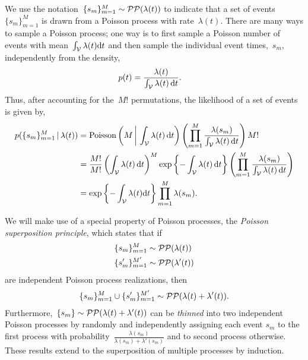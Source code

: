We use the notation~${\{s_m\}_{m=1}^M\sim\mathcal{PP}(\lambda(t))}$ to indicate
that a set of events~$\{s_m\}_{m=1}^M$ is drawn from a Poisson process
with rate~$\lambda(t)$. There are many ways to sample a Poisson
process; one way is to first sample a Poisson number of events with
mean~${\int_{\mathcal{V}} \lambda(t) \mathrm{d}t}$ and then sample the individual
event times,~$s_m$, independently from the density,
\begin{align*}
  p(t) &= \frac{\lambda(t)}{\int_{\mathcal{V}} \lambda(t) \, \mathrm{d}t}.
\end{align*}
Thus, after accounting for the~$M!$ permutations,
the likelihood of a set of events is given by,
\begin{align}
  \nonumber
  p(\{s_m\}_{m=1}^M \,|\, \lambda(t))
  &= \mathrm{Poisson} \left(M \, \bigg| \, \int_{\mathcal{V}} \lambda(t) \, \mathrm{d} t \right)
  \left( \prod_{m=1}^M \frac{\lambda(s_m)}{\int_{\mathcal{V}} \lambda(t) \, \mathrm{d}t} \right)  M! \\
  \nonumber
  &= \frac{M!}{M!} \left(\int_{\mathcal{V}} \lambda(t) \, \mathrm{d} t \right)^M
  \exp \left \{-\int_{\mathcal{V}} \lambda(t) \, \mathrm{d} t \right \} 
  \left( \prod_{m=1}^M \frac{\lambda(s_m)}{\int_{\mathcal{V}} \lambda(t) \, \mathrm{d}t} \right) \\
  \label{eq:poisson_lkhd}
  &=\exp\left\{-\int_{\mathcal{V}}\lambda(t)\mathrm{d}t \right\}
  \prod_{m=1}^M\lambda(s_m).
\end{align}


We will make use of a special property of Poisson processes, the
\emph{Poisson superposition principle}, which states that if
\begin{align*}
  \{s_{m}\}_{m=1}^{M} &\sim \mathcal{PP}(\lambda(t))\\
  \{s'_{m}\}_{m=1}^{M'} &\sim \mathcal{PP}(\lambda'(t))
\end{align*}
are independent Poisson process realizations, then
\begin{align*}
\{s_{m}\}_{m=1}^{M} \cup \{s'_{m}\}_{m=1}^{M'} \sim \mathcal{PP}(\lambda(t)+\lambda'(t)).
\end{align*}
Furthermore,~${\{s_m\}\sim\mathcal{PP}(\lambda(t)+\lambda'(t))}$ can be
\emph{thinned} into two independent Poisson processes by randomly and
independently assigning each event $s_m$ to the first process with
probability~$\frac{\lambda(s_m)}{\lambda(s_m)+\lambda'(s_m)}$ and to
second process otherwise. These results extend to the superposition of
multiple processes by induction.

